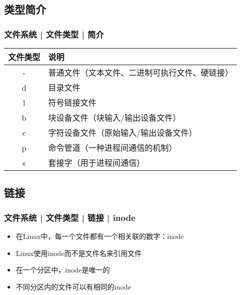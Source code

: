 \subsection{类型简介}
\begin{frame}
  \frametitle{文件系统 | 文件类型 | 简介}
  \begin{table}
    \centering
    \begin{tabular}{cl}
      \hline
      \rowcolor{blue!50}文件类型 & 说明\\
      \hline
      \alert{-} & 普通文件（文本文件、二进制可执行文件、硬链接）\\
      \alert{d} & 目录文件\\
      \alert{l} & 符号链接文件\\
      b & 块设备文件（块输入/输出设备文件）\\
      c & 字符设备文件（原始输入/输出设备文件）\\
      p & 命令管道（一种进程间通信的机制）\\
      s & 套接字（用于进程间通信）\\
      \hline
    \end{tabular}
  \end{table}
\end{frame}

\subsection{链接}
\begin{frame}
  \frametitle{文件系统 | 文件类型 | 链接 | inode}
  \begin{itemize}[<+->]
    \item 在Linux中，每一个文件都有一个相关联的数字：inode
    \item Linux使用inode而不是文件名来引用文件
    \item 在一个分区中，inode是唯一的
    \item 不同分区内的文件可以有相同的inode
  \end{itemize}
  \begin{figure}
    \centering
  \end{figure}
\end{frame}


